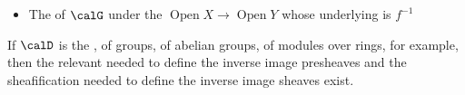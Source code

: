\begin{definition}
\begin{enumerate}
{\begin{itemize}
                \item The  of $\calG$ under the  $\operatorname{Open} X \to \operatorname{Open} Y$ whose underlying  is $f^{-1}$

            \end{itemize}
            
        }{
        }

    \end{enumerate}
    If $\calD$ is the , of groups, of abelian groups, of modules over rings, for example, then the relevant  needed to define the inverse image presheaves and the sheafification needed to define the inverse image sheaves exist.
\end{definition}
